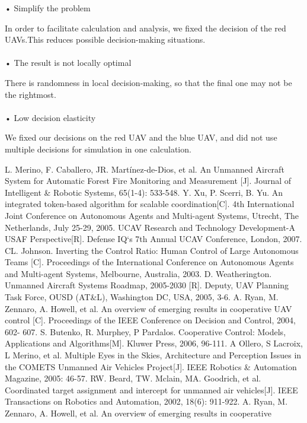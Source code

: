 \documentclass{mcmthesis}
\begin{document}
• Simplify the problem \par
	In order to facilitate calculation and analysis, we fixed the decision of the red UAVs.This reduces possible decision-making situations. \\ \\
• The result is not locally optimal \par
	There is randomness in local decision-making, so that the final one may not be the rightmost.\\ \\
• Low decision elasticity \par
	We fixed our decisions on the red UAV and the blue UAV, and did not use multiple decisions for simulation in one calculation. \\

\begin{thebibliography}{99}
\bibitem L. Merino, F. Caballero, JR. Martínez-de-Dios, et al. An Unmanned Aircraft System for
Automatic Forest Fire Monitoring and Measurement [J]. Journal of Intelligent \& Robotic
Systems, 65(1-4): 533-548.
\bibitem Y. Xu, P. Scerri, B. Yu. An integrated token-based algorithm for scalable coordination[C].
4th International Joint Conference on Autonomous Agents and Multi-agent Systems, Utrecht,
The Netherlands, July 25-29, 2005.
\bibitem UCAV Research and Technology Development-A USAF Perspective[R]. Defense IQ`s 7th
Annual UCAV Conference, London, 2007.
\bibitem CL. Johnson. Inverting the Control Ratio: Human Control of Large Autonomous Teams
[C]. Proceedings of the International Conference on Autonomous Agents and Multi-agent
Systems, Melbourne, Australia, 2003.
\bibitem D. Weatherington. Unmanned Aircraft Systems Roadmap, 2005-2030 [R]. Deputy, UAV
Planning Task Force, OUSD (AT\&L), Washington DC, USA, 2005, 3-6.
\bibitem A. Ryan, M. Zennaro, A. Howell, et al. An overview of emerging results in cooperative
UAV control [C]. Proceedings of the IEEE Conference on Decision and Control, 2004, 602-
607.
\bibitem S. Butenko, R. Murphey, P Pardalos. Cooperative Control: Models, Applications and
Algorithms[M]. Kluwer Press, 2006, 96-111.
\bibitem A Ollero, S Lacroix, L Merino, et al. Multiple Eyes in the Skies, Architecture and
Perception Issues in the COMETS Unmanned Air Vehicles Project[J]. IEEE Robotics \&
Automation Magazine, 2005: 46-57.
\bibitem RW. Beard, TW. Mclain, MA. Goodrich, et al. Coordinated target assignment and intercept
for unmanned air vehicles[J]. IEEE Transactions on Robotics and Automation, 2002, 18(6):
911-922.
\bibitem A. Ryan, M. Zennaro, A. Howell, et al. An overview of emerging results in cooperative

\end{thebibliography}
\end{document}

